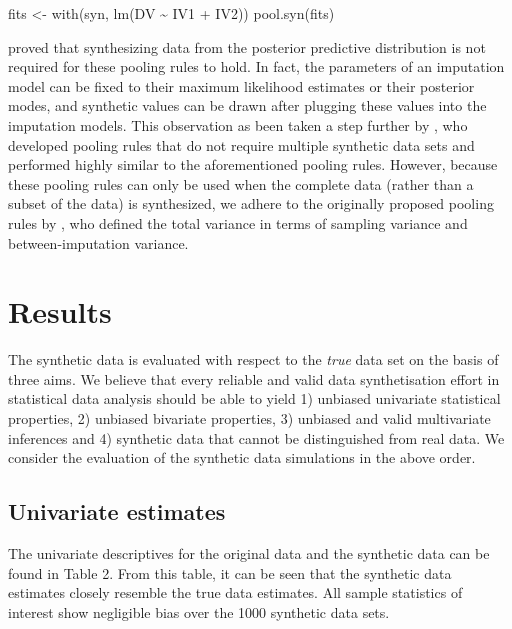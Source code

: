 \documentclass[psych,article,submit,moreauthors,pdftex]{mdpi}
\newenvironment{Shaded}{\begin{snugshade}}{\end{snugshade}}
\newcommand{\FunctionTok}[1]{\textcolor[rgb]{0.00,0.00,0.00}{#1}}
\newcommand{\NormalTok}[1]{#1}
\newcommand{\OtherTok}[1]{\textcolor[rgb]{0.56,0.35,0.01}{#1}}
\newcommand{\SpecialCharTok}[1]{\textcolor[rgb]{0.00,0.00,0.00}{#1}}
\begin{document}
\begin{Shaded}
\begin{Highlighting}[]
\NormalTok{fits }\OtherTok{\textless{}{-}} \FunctionTok{with}\NormalTok{(syn, }\FunctionTok{lm}\NormalTok{(DV }\SpecialCharTok{\textasciitilde{}}\NormalTok{ IV1 }\SpecialCharTok{+}\NormalTok{ IV2))}
\FunctionTok{pool.syn}\NormalTok{(fits)}
\end{Highlighting}
\end{Shaded}

\citet{reiter_kinney_2012} proved that synthesizing data from the
posterior predictive distribution is not required for these pooling
rules to hold. In fact, the parameters of an imputation model can be
fixed to their maximum likelihood estimates or their posterior modes,
and synthetic values can be drawn after plugging these values into the
imputation models. This observation as been taken a step further by
\citet{raab_practical_2016}, who developed pooling rules that do not
require multiple synthetic data sets and performed highly similar to the
aforementioned pooling rules. However, because these pooling rules can
only be used when the complete data (rather than a subset of the data)
is synthesized, we adhere to the originally proposed pooling rules by
\citet{reiter_partially_inference_2003}, who defined the total variance
in terms of sampling variance and between-imputation variance.

\hypertarget{results}{%
\section{Results}\label{results}}

The synthetic data is evaluated with respect to the \emph{true} data set
on the basis of three aims. We believe that every reliable and valid
data synthetisation effort in statistical data analysis should be able
to yield 1) unbiased univariate statistical properties, 2) unbiased
bivariate properties, 3) unbiased and valid multivariate inferences and
4) synthetic data that cannot be distinguished from real data. We
consider the evaluation of the synthetic data simulations in the above
order.

\hypertarget{univariate-estimates}{%
\subsection{Univariate estimates}\label{univariate-estimates}}

The univariate descriptives for the original data and the synthetic data
can be found in Table 2. From this table, it can be seen that the
synthetic data estimates closely resemble the true data estimates. All
sample statistics of interest show negligible bias over the 1000
synthetic data sets.
\end{document}
